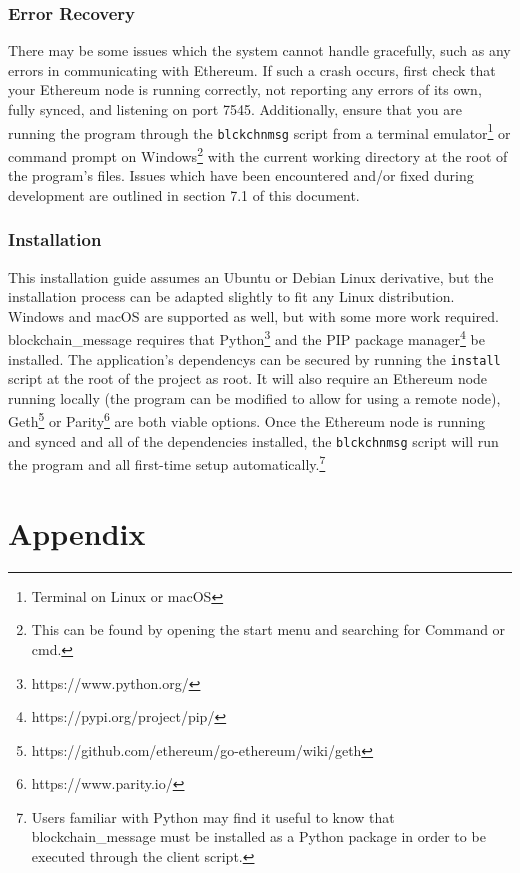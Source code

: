 \documentclass[titlepage]{report}
\begin{document}
\subsection{Error Recovery}
There may be some issues which the system cannot handle gracefully, such as any errors in communicating with \gls{Ethereum}. If such a crash occurs, first check that your \gls{Ethereum} \gls{node} is running correctly, not reporting any errors of its own, fully \gls{synced}, and listening on port 7545. Additionally, ensure that you are running the program through the \texttt{blckchnmsg} script from a terminal emulator\footnote{Terminal on Linux or macOS} or command prompt on Windows\footnote{This can be found by opening the start menu and searching for Command or cmd.} with the current working directory at the root of the program's files. Issues which have been encountered and/or fixed during development are outlined in section 7.1 of this document.

\subsection{Installation}
This installation guide assumes an Ubuntu or Debian Linux derivative, but the installation process can be adapted slightly to fit any Linux distribution. Windows and macOS are supported as well, but with some more work required. blockchain\_message requires that Python\footnote{https://www.python.org/} and the PIP package manager\footnote{https://pypi.org/project/pip/} be installed. The application's \glspl{dependency} can be secured by running the \texttt{install} script at the root of the project as root. It will also require an \gls{Ethereum} \gls{node} running locally (the program can be modified to allow for using a remote \gls{node}), Geth\footnote{https://github.com/ethereum/go-ethereum/wiki/geth} or Parity\footnote{https://www.parity.io/} are both viable options. Once the Ethereum \gls{node} is running and \gls{synced} and all of the dependencies installed, the \texttt{blckchnmsg} script will run the program and all first-time setup automatically.\footnote{Users familiar with Python may find it useful to know that blockchain\_message must be installed as a Python package in order to be executed through the client script.}

\pagebreak
\chapter{Appendix}
\end{document}
